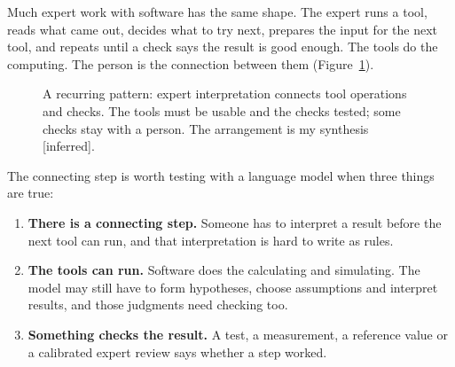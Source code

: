 \documentclass[10pt]{article}
\newcommand{\dpmono}{\fontfamily{zi4}\selectfont}
\newcommand{\inferred}{\textsf{\small[inferred]}}
\begin{document}
Much expert work with software has the same shape.
The expert runs a tool, reads what came out, decides what to try next, prepares the input for the next tool, and repeats until a check says the result is good enough.
The tools do the computing.
The person is the connection between them (Figure~\ref{fig:glue}).

\begin{figure}[htbp]
\centering
{}
\caption{A recurring pattern: expert interpretation connects tool operations and checks. The tools must be usable and the checks tested; some checks stay with a person. The arrangement is my synthesis \inferred.}
\label{fig:glue}
\end{figure}

The connecting step is worth testing with a language model when three things are true:
\begin{enumerate}
\item \textbf{There is a connecting step.} Someone has to interpret a result before the next tool can run, and that interpretation is hard to write as rules.
\item \textbf{The tools can run.} Software does the calculating and simulating. The model may still have to form hypotheses, choose assumptions and interpret results, and those judgments need checking too.
\item \textbf{Something checks the result.} A test, a measurement, a reference value or a calibrated expert review says whether a step worked.
\end{enumerate}
\end{document}

